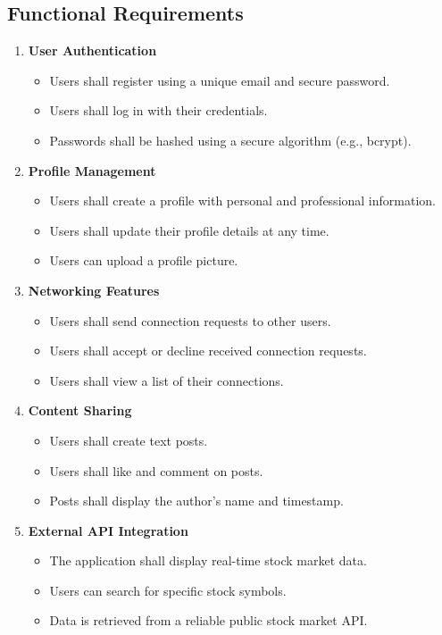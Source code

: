 \documentclass[12pt,a4paper]{report}
\begin{document}
\subsection{Functional Requirements}
\begin{enumerate}
    \item \textbf{User Authentication}
    \begin{itemize}
        \item Users shall register using a unique email and secure password.
        \item Users shall log in with their credentials.
        \item Passwords shall be hashed using a secure algorithm (e.g., bcrypt).
    \end{itemize}
    \item \textbf{Profile Management}
    \begin{itemize}
        \item Users shall create a profile with personal and professional information.
        \item Users shall update their profile details at any time.
        \item Users can upload a profile picture.
    \end{itemize}
    \item \textbf{Networking Features}
    \begin{itemize}
        \item Users shall send connection requests to other users.
        \item Users shall accept or decline received connection requests.
        \item Users shall view a list of their connections.
    \end{itemize}
    \item \textbf{Content Sharing}
    \begin{itemize}
        \item Users shall create text posts.
        \item Users shall like and comment on posts.
        \item Posts shall display the author's name and timestamp.
    \end{itemize}
    \item \textbf{External API Integration}
    \begin{itemize}
        \item The application shall display real-time stock market data.
        \item Users can search for specific stock symbols.
        \item Data is retrieved from a reliable public stock market API.
    \end{itemize}
\end{enumerate}
\end{document}
